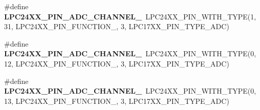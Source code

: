 \begin{DoxyCompactItemize}
\item 
\mbox{\label{group__lpc24xx__io_ga02c6a3bd9e3f20610c45c4161b8bcd15}} 
\#define {\bfseries L\+P\+C24\+X\+X\+\_\+\+P\+I\+N\+\_\+\+A\+D\+C\+\_\+\+C\+H\+A\+N\+N\+E\+L\+\_}~L\+P\+C24\+X\+X\+\_\+\+P\+I\+N\+\_\+\+W\+I\+T\+H\+\_\+\+T\+Y\+PE(1, 31, L\+P\+C24\+X\+X\+\_\+\+P\+I\+N\+\_\+\+F\+U\+N\+C\+T\+I\+O\+N\+\_, 3, L\+P\+C17\+X\+X\+\_\+\+P\+I\+N\+\_\+\+T\+Y\+P\+E\+\_\+\+A\+DC)
\item 
\mbox{\label{group__lpc24xx__io_gab8382e28f314e5f437676461ceef88b6}} 
\#define {\bfseries L\+P\+C24\+X\+X\+\_\+\+P\+I\+N\+\_\+\+A\+D\+C\+\_\+\+C\+H\+A\+N\+N\+E\+L\+\_}~L\+P\+C24\+X\+X\+\_\+\+P\+I\+N\+\_\+\+W\+I\+T\+H\+\_\+\+T\+Y\+PE(0, 12, L\+P\+C24\+X\+X\+\_\+\+P\+I\+N\+\_\+\+F\+U\+N\+C\+T\+I\+O\+N\+\_, 3, L\+P\+C17\+X\+X\+\_\+\+P\+I\+N\+\_\+\+T\+Y\+P\+E\+\_\+\+A\+DC)
\item 
\mbox{\label{group__lpc24xx__io_gae1e7c883d44cb6cec731ef4b6605ae49}} 
\#define {\bfseries L\+P\+C24\+X\+X\+\_\+\+P\+I\+N\+\_\+\+A\+D\+C\+\_\+\+C\+H\+A\+N\+N\+E\+L\+\_}~L\+P\+C24\+X\+X\+\_\+\+P\+I\+N\+\_\+\+W\+I\+T\+H\+\_\+\+T\+Y\+PE(0, 13, L\+P\+C24\+X\+X\+\_\+\+P\+I\+N\+\_\+\+F\+U\+N\+C\+T\+I\+O\+N\+\_, 3, L\+P\+C17\+X\+X\+\_\+\+P\+I\+N\+\_\+\+T\+Y\+P\+E\+\_\+\+A\+DC)
\end{DoxyCompactItemize}
